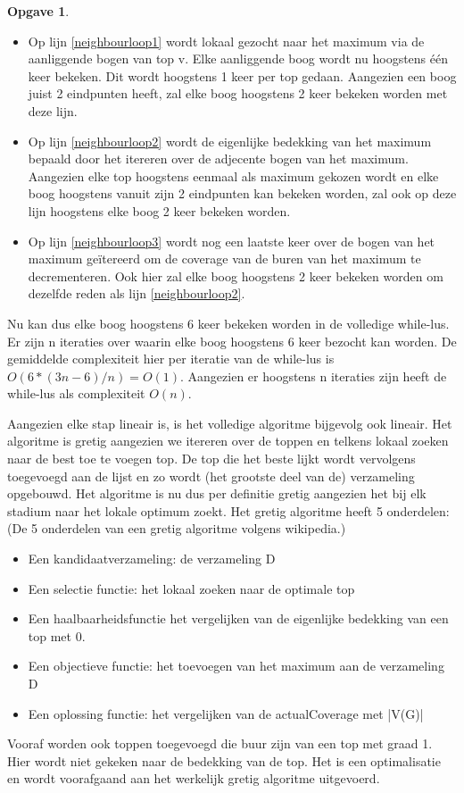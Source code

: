 \documentclass[11pt, a4paper, table]{article}
\theoremstyle{definition}
\newtheorem{opgave}{Opgave}
\theoremstyle{definition}
\theoremstyle{definition}
\begin{document}
\begin{opgave}
\begin{itemize}
			\begin{itemize}
				\item Op lijn \ref{neighbourloop1} wordt lokaal gezocht naar het maximum via de aanliggende bogen van top v. Elke aanliggende boog wordt nu hoogstens \'{e}\'{e}n keer bekeken. Dit wordt hoogstens 1 keer per top gedaan. Aangezien een boog juist 2 eindpunten heeft, zal elke boog hoogstens 2 keer bekeken worden met deze lijn. 
				\item Op lijn \ref{neighbourloop2} wordt de eigenlijke bedekking van het maximum bepaald door het itereren over de adjecente bogen van het maximum. Aangezien elke top hoogstens eenmaal als maximum gekozen wordt en elke boog hoogstens vanuit zijn 2 eindpunten kan bekeken worden, zal ook op deze lijn hoogstens elke boog 2 keer bekeken worden. 
				\item Op lijn \ref{neighbourloop3} wordt nog een laatste keer over de bogen van het maximum ge\"itereerd om de coverage van de buren van het maximum te decrementeren. 
				Ook hier zal elke boog hoogstens 2 keer bekeken worden om dezelfde reden als lijn \ref{neighbourloop2}.
			\end{itemize}
			
			 Nu kan dus elke boog hoogstens 6 keer bekeken worden in de volledige while-lus. Er zijn n iteraties over waarin elke boog hoogstens 6 keer bezocht kan worden. De gemiddelde complexiteit hier per iteratie van de while-lus is $O(6*(3n-6)/n)=O(1)$. Aangezien er hoogstens n iteraties zijn heeft de while-lus als complexiteit $O(n)$. 
	\end{itemize}
		Aangezien elke stap lineair is, is het volledige algoritme bijgevolg ook lineair. 
		\vspace{0.1cm}
		\newline
		Het algoritme is gretig aangezien we itereren over de toppen en telkens lokaal zoeken naar de best toe te voegen top. De top die het beste lijkt wordt vervolgens toegevoegd aan de lijst en zo wordt (het grootste deel van de) verzameling opgebouwd. Het algoritme is nu dus per definitie gretig aangezien het bij elk stadium naar het lokale optimum zoekt.
		Het gretig algoritme heeft 5 onderdelen: (De 5 onderdelen van een gretig algoritme volgens wikipedia.)
		\begin{itemize}
			\item Een kandidaatverzameling: de verzameling D
			\item Een selectie functie: het lokaal zoeken naar de optimale top
			\item Een haalbaarheidsfunctie het vergelijken van de eigenlijke bedekking van een top met 0. 
			\item Een objectieve functie: het toevoegen van het maximum aan de verzameling D
			\item Een oplossing functie: het vergelijken van de actualCoverage met |V(G)|
		\end{itemize} 
	 Vooraf worden ook toppen toegevoegd die buur zijn van een top met graad 1. Hier wordt niet gekeken naar de bedekking van de top. Het is een optimalisatie en wordt voorafgaand aan het werkelijk gretig algoritme uitgevoerd. 

\end{opgave}
\end{document}
